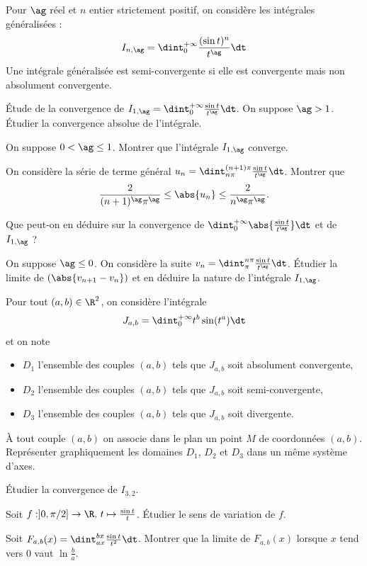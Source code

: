 \begin{probleme}
Pour $\ag$ réel et $n$ entier strictement positif, on considère les intégrales généralisées :
\[
I_{n,\ag} = \dint_0^{+\infty} \frac{(\sin t)^n}{t^\ag} \dt
\]
Une intégrale généralisée est semi-convergente si elle est convergente mais non absolument convergente.

\qu Étude de la convergence de $I_{1,\ag} = \dint_0^{+\infty} \frac{\sin t}{t^\ag} \dt$.
\squ On suppose $\ag > 1$. Étudier la convergence absolue de l'intégrale.

\squ On suppose $0 < \ag \leq 1$.
\ssqu Montrer que l'intégrale $I_{1,\ag}$ converge.

\ssqu On considère la série de terme général $u_n = \dint_{n\pi}^{(n+1)\pi} \frac{\sin t}{t^\ag} \dt$. Montrer que
\[
\frac{2}{(n+1)^\ag \pi^\ag} \leq \abs{u_n} \leq \frac{2}{n^\ag \pi^\ag}.
\]

\ssqu Que peut-on en déduire sur la convergence de $\dint_0^{+\infty} \abs{\frac{\sin t}{t^\ag}} \dt$ et de $I_{1,\ag}$ ?

\squ On suppose $\ag \leq 0$. On considère la suite $v_n = \dint_\pi^{n \pi} \frac{\sin t}{t^\ag} \dt$. Étudier la limite de $(\abs{v_{n+1} - v_n})$ et en déduire la nature de l'intégrale $I_{1,\ag}$.

\qu Pour tout $(a, b) \in \R^2$, on considère l'intégrale
\[
J_{a,b} = \dint_0^{+\infty} t^b \sin(t^a) \dt
\]
et on note
\begin{itemize}
\item $D_1$ l'ensemble des couples $(a, b)$ tels que $J_{a,b}$ soit absolument convergente,
\item $D_2$ l'ensemble des couples $(a, b)$ tels que $J_{a,b}$ soit semi-convergente,
\item $D_3$ l'ensemble des couples $(a, b)$ tels que $J_{a,b}$ soit divergente.
\end{itemize}
À tout couple $(a, b)$ on associe dans le plan un point $M$ de coordonnées $(a, b)$. Représenter graphiquement les domaines $D_1$, $D_2$ et $D_3$ dans un même système d'axes.

\qu Étudier la convergence de $I_{3,2}$.

\Qu Soit $f : ]0,\pi/2] \to \R,\, t \mapsto \frac{\sin t}{t}$. Étudier le sens de variation de $f$.

\squ Soit $F_{a,b}(x) = \dint_{a x}^{b x} \frac{\sin t}{t^2} \dt$. Montrer que la limite de $F_{a,b}(x)$ lorsque $x$ tend vers $0$ vaut $\ln \frac{b}{a}$.


\end{probleme}
